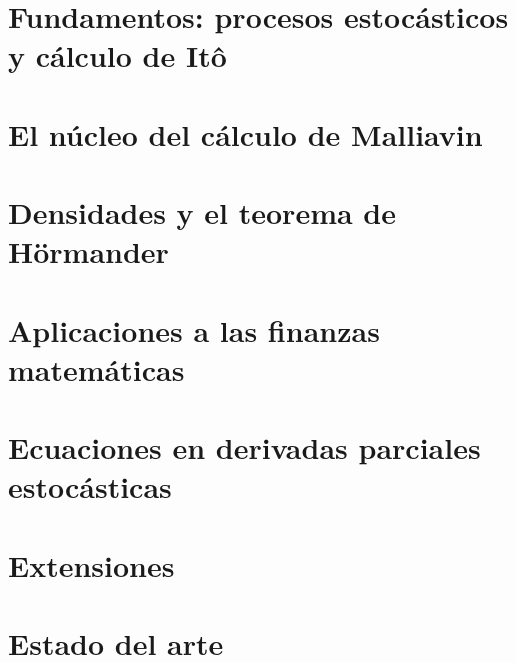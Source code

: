 \documentclass[11pt,a4paper,twoside,openany]{book}
\begin{document}
\frontmatter


{\hypersetup{linkcolor=black}\tableofcontents}

\mainmatter
\part{Fundamentos: procesos estocásticos y cálculo de Itô}





\part{El núcleo del cálculo de Malliavin}






\part{Densidades y el teorema de Hörmander}



\part{Aplicaciones a las finanzas matemáticas}




\part{Ecuaciones en derivadas parciales estocásticas}




\part{Extensiones}



\part{Estado del arte}





\appendix



\backmatter

\end{document}
